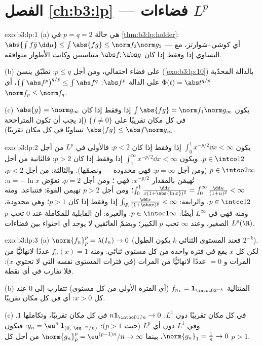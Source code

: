 \section*{الفصل \ref{ch:b3:lp} --- فضاءات $L^p$}

\begin{solution}{exo:b3:lp:1}
(a) هي حالة $p = q = 2$ في \cref{thm:b3:lp:holder}: $\abs{\int f\bar
g\,\dd\mu} \leq \int\abs{fg} \leq \norm f_2\norm g_2$ --- أي
كوشي--شوارتز، مع التساوي إذا وفقط إذا كان $\abs f, \abs g$
متناسبين وكانت الأطوار متوافقة.

(b) على فضاء احتمالي، ومن أجل $p \leq q$: نطبّق ينسن
(\cref{exo:b3:lp:10}) بالدالة المحدّبة $\Phi(t) =
\abs t^{q/p}$ على الدالة $\abs f^p$:
$\bigl(\int\abs f^p\bigr)^{q/p} \leq \int\abs f^q$، أي
$\norm f_p \leq \norm f_q$.

(c) يكون $\int\abs{fg} = \norm f_1\norm g_\infty$ إذا وفقط إذا كان $\abs{g} =
\norm g_\infty$ في كل مكان تقريبًا على
$\{f \neq 0\}$ (إذ يجب أن تكون المتراجحة $\abs{fg} \leq \abs f\norm g_\infty$ تساويًا في كل
مكان تقريبًا).
\end{solution}

\begin{solution}{exo:b3:lp:2}
يكون $\int_0^1 x^{-p/2}\dd x < \infty$ إذا وفقط إذا كان $p < 2$: فالأولى في $L^p$ من أجل
$p \in \intco12$. ويكون $\int_1^\infty x^{-p/2}\dd x <
\infty$ إذا وفقط إذا كان $p > 2$:
فالثانية من أجل $p \in \intoo2\infty$ (ومن أجل $p = \infty$: فهي محدودة ---
ونضمّها). والثالثة: من أجل $p <
2$، تُهيمَن بالمقدار $x^{-p/2}$:
فهي ؛ ومن أجل $p = 2$، نعوّض $u = -\ln x$:
$\int_0^1\frac{\dd x}{x(1 + \abs{\ln
x})^2} = \int_0^\infty\frac{\dd u}{(1 + u)^2} < \infty$؛ ومن أجل $p > 2$ تهيمن القوة: فتتباعد. ومنه
$p \in \intcc12$. والرابعة: $\int_\R\frac{\dd x}{(1 + \abs x)^p} < \infty$ إذا وفقط إذا كان $p >
1$؛ وهي
محدودة، ومنه فهي في $L^\infty$ أيضًا: $p \in
\intoc1\infty$. والعبرة: أن
القابلية للمكاملة عند $0$ تحب $p$ الصغير، وعند $\infty$ تحب $p$
الكبير؛ وبضمّ العائقين لا يوجد أي احتواء بين فضاءات $L^p(\R)$.
\end{solution}

\begin{solution}{exo:b3:lp:3}
(a) $\norm{f_n}_p^p = \lambda(I_n) \to 0$ (فعند المستوى الثنائي $k$ يكون الطول $2^{-k}$). لكن
كل $x$ يقع في فترة واحدة من كل مستوى ثنائي: ومنه $f_n(x) = 1$
عددًا لانهائيًّا من المرات و $= 0$ عددًا لانهائيًّا من المرات
(في فترات المستوى نفسه التي لا تحتوي $x$): فلا تقارب في أي
نقطة.

(b) المتتالية $f_{n_k} = \mathbf 1_{\intcc0{2^{-k}}}$ (أي الفترة الأولى من كل مستوى) تتقارب إلى
$0$ عند كل $x > 0$: أي في كل مكان تقريبًا.

(c) في كل مكان تقريبًا دون $L^1$: $n\mathbf 1_{\intoo0{1/n}} \to 0$ في كل مكان تقريبًا،
وتكاملها $1$. وفي $L^1$ دون أي $L^p$ (حيث $p > 1$): $g_n =
\eu^n\,\mathbf 1_{(0,\ \eu^{-n}/n)}$:
فيكون $\norm{g_n}_1 = \frac1n
\to 0$، بينما $\norm{g_n}_p^p = \eu^{(p-1)n}/n \to \infty$ من أجل كل $p > 1$.
\end{solution}

